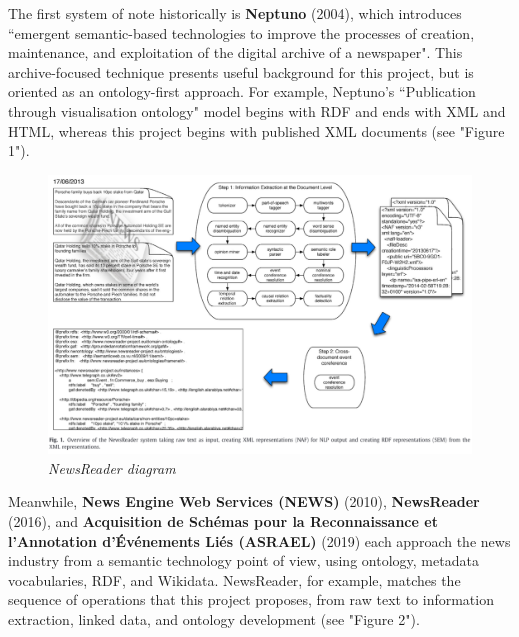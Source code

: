\documentclass[11pt]{article}
\begin{document}
The first system of note historically is \textbf{Neptuno} (2004)\cite{castells2004neptuno}, which introduces ``emergent semantic-based technologies to improve the processes of creation, maintenance, and exploitation of the digital archive of a newspaper". This archive-focused technique presents useful background for this project, but is oriented as an ontology-first approach. For example, Neptuno's ``Publication through visualisation ontology" model begins with RDF and ends with XML and HTML, whereas this project begins with published XML documents (see "Figure 1").

\begin{figure}
  \centerline{\includegraphics[scale=0.4]{literature-review--newsreader.png}}
  \caption{\textit{NewsReader diagram}}
\end{figure}

Meanwhile, \textbf{News Engine Web Services (NEWS)} \cite{fernandez2010news} (2010), \textbf{NewsReader} \cite{vossen2016newsreader} (2016), and \textbf{Acquisition de Schémas pour la Reconnaissance et l'Annotation d'Événements Liés (ASRAEL)} \cite{rudnik2019searching} (2019) each approach the news industry from a semantic technology point of view, using ontology, metadata vocabularies, RDF, and Wikidata. NewsReader, for example, matches the sequence of operations that this project proposes, from raw text to information extraction, linked data, and ontology development (see "Figure 2").
\end{document}
